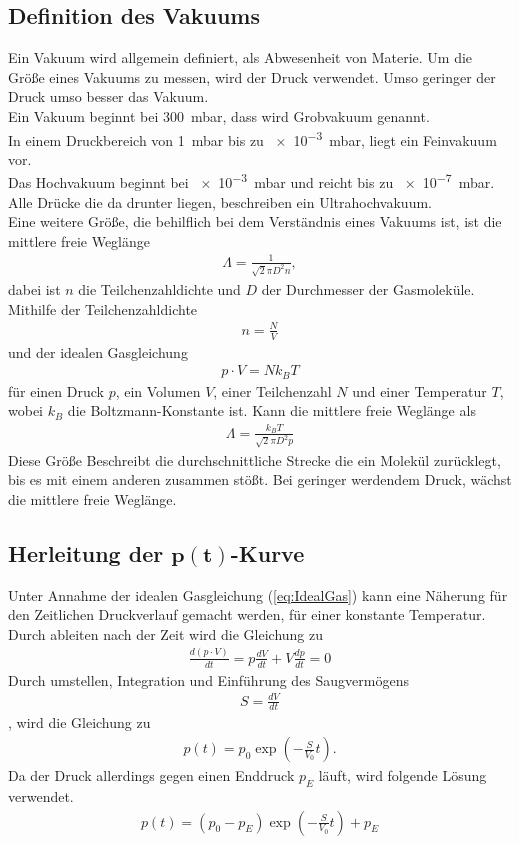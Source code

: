 \subsection{Definition des Vakuums}
Ein Vakuum wird allgemein definiert, als Abwesenheit von Materie.
Um die Größe eines Vakuums zu messen, wird der Druck verwendet. Umso geringer der Druck umso besser das Vakuum.\\
Ein Vakuum beginnt bei \SI{300}{\milli\bar}, dass wird Grobvakuum genannt.\\
In einem Druckbereich von \SI{1}{\milli\bar} bis zu \SI{e-3}{\milli\bar}, liegt ein Feinvakuum vor.\\
Das Hochvakuum beginnt bei \SI{e-3}{\milli\bar} und reicht bis zu \SI{e-7}{\milli\bar}. Alle Drücke die da drunter liegen, beschreiben ein Ultrahochvakuum.\\
Eine weitere Größe, die behilflich bei dem Verständnis eines Vakuums ist, ist die mittlere freie Weglänge
\begin{align}
\Lambda = \frac{1}{\sqrt{2}\pi D^2n},
\end{align}
dabei ist $n$ die Teilchenzahldichte und $D$ der Durchmesser der Gasmoleküle. Mithilfe der Teilchenzahldichte 
\begin{align}
n=\frac{N}{V}
\end{align}
und der idealen Gasgleichung
\begin{align}
p\cdot V = N k_B T \label{eq:IdealGas}
\end{align}
für einen Druck $p$, ein Volumen $V$, einer Teilchenzahl $N$ und einer Temperatur $T$, wobei $k_B$ die Boltzmann-Konstante ist.
Kann die mittlere freie Weglänge als
\begin{align}
\Lambda = \frac{k_BT}{\sqrt{2}\pi D^2p}
\end{align} 
Diese Größe Beschreibt die durchschnittliche Strecke die ein Molekül zurücklegt, bis es mit einem anderen zusammen stößt. Bei geringer werdendem Druck, wächst die mittlere freie Weglänge.

\subsection[Herleitung der $p(t)$-Kurve]{Herleitung der $\mathbf{p(t)}$-Kurve}
Unter Annahme der idealen Gasgleichung (\ref{eq:IdealGas})
kann eine Näherung für den Zeitlichen Druckverlauf gemacht werden, für einer konstante Temperatur.
Durch ableiten nach der Zeit wird die Gleichung zu
\begin{align}
\frac{d\left(p\cdot V \right)}{dt}=p\frac{dV}{dt}+V\frac{dp}{dt}=0
\end{align}
Durch umstellen, Integration und Einführung des Saugvermögens 
\begin{align}
S=\frac{dV}{dt}
\end{align} , wird die Gleichung zu
\begin{align}
p(t) = p_0 \exp\left(-\frac{S}{V_0}t\right).
\end{align}
Da der Druck allerdings gegen einen Enddruck $p_E$ läuft, wird folgende Lösung verwendet.
\begin{align}
p(t) = \left( p_0-p_E \right) \exp\left(-\frac{S}{V_0}t\right) + p_E
\end{align}
